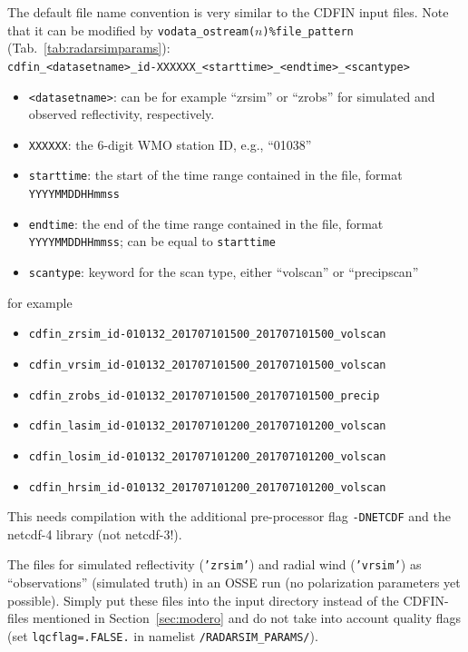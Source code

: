 \documentclass[10pt,a4paper,twoside,headinclude,footinclude,parskip=half]{scrartcl}
\newcommand{\srcform}[1]{\mbox{\texttt{#1}}\xspace}%
\newcommand{\paramform}[1]{\mbox{\texttt{#1}}\xspace}%
\begin{document}
\begin{itemize}
    The default file name convention is very similar to the CDFIN input files. Note that it can be modified by \paramform{vodata_ostream($n$)\%file_pattern} (Tab.~\ref{tab:radarsimparams}):\\[0.5em]
    \verb|cdfin_<datasetname>_id-XXXXXX_<starttime>_<endtime>_<scantype>|
    \begin{itemize}
    \item \verb|<datasetname>|: can be for example ``zrsim'' or ``zrobs'' for simulated and observed reflectivity, respectively.    
    \item \verb|XXXXXX|: the 6-digit WMO station ID, e.g., ``01038''
    \item \verb|starttime|: the start of the time range contained in the file, format \verb|YYYYMMDDHHmmss|
    \item \verb|endtime|:  the end of the time range contained in the file, format \verb|YYYYMMDDHHmmss|; can be equal to \verb|starttime|
    \item \verb|scantype|: keyword for the scan type, either ``volscan'' or ``precipscan''
    \end{itemize}
    for example
    \begin{itemize}
    \item \verb|cdfin_zrsim_id-010132_201707101500_201707101500_volscan|
    \item \verb|cdfin_vrsim_id-010132_201707101500_201707101500_volscan|
    \item \verb|cdfin_zrobs_id-010132_201707101500_201707101500_precip|
    \item \verb|cdfin_lasim_id-010132_201707101200_201707101200_volscan|
    \item \verb|cdfin_losim_id-010132_201707101200_201707101200_volscan|
    \item \verb|cdfin_hrsim_id-010132_201707101200_201707101200_volscan|
    \end{itemize}
    This needs compilation with the additional pre-processor flag \srcform{-DNETCDF} and the netcdf-4 library (not netcdf-3!).

    The files for simulated reflectivity (\srcform{'zrsim'}) and radial wind (\srcform{'vrsim'})
    as ``observations'' (simulated truth) in an OSSE run (no polarization parameters yet possible). Simply put these files into the input directory
    instead of the CDFIN-files mentioned in Section~\ref{sec:modero} and do not take into account
    quality flags (set \srcform{lqcflag=.FALSE.} in namelist \srcform{/RADARSIM_PARAMS/}).


\end{itemize}
\end{document}
